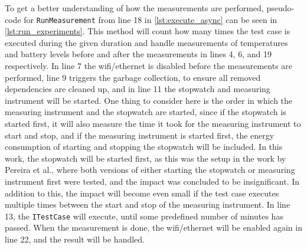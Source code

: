 To get a better understanding of how the measurements are performed, pseudo-code for \texttt{RunMeasurement} from line 18 in \cref{lst:execute_async} can be seen in \cref{lst:run_experiments}. This method will count how many times the test case is executed during the given duration and handle measurements of temperatures and battery levels before and after the measurements in lines 4, 6, and 19 respectively. In line 7 the wifi/ethernet is disabled before the measurements are performed, line 9 triggers the garbage collection, to ensure all removed dependencies are cleaned up, and in line 11 the stopwatch and measuring instrument will be started. One thing to consider here is the order in which the measuring instrument and the stopwatch are started, since if the stopwatch is started first, it will also measure the time it took for the measuring instrument to start and stop, and if the measuring instrument is started first, the energy consumption of starting and stopping the stopwatch will be included. In this work, the stopwatch will be started first, as this was the setup in the work by Pereira et al.\cite[]{Pereira2017}, where both versions of either starting the stopwatch or measuring instrument first were tested, and the impact was concluded to be insignificant. In addition to this, the impact will become even small if the test case executes multiple times between the start and stop of the measuring instrument. In line 13, the \texttt{ITestCase} will execute, until some predefined number of minutes has passed. When the measurement is done, the wifi/ethernet will be enabled again in line 22, and the result will be handled.





